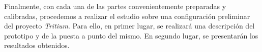 Finalmente, con cada una de las partes convenientemente preparadas y calibradas, procedemos a realizar el estudio sobre una configuración preliminar del proyecto \textit{Tritium}. Para ello, en primer lugar, se realizará una descripción del prototipo y de la puesta a punto del mismo. En segundo lugar, se presentarán los resultados obtenidos.